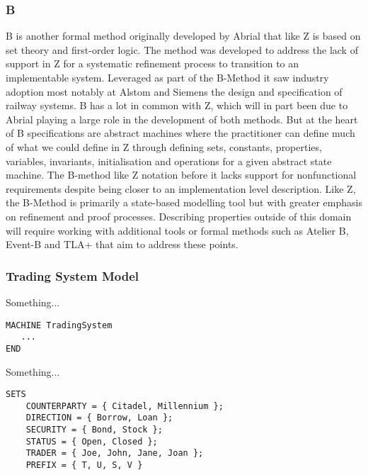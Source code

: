 \documentclass{article}
\begin{document}
\subsubsection*{B}

B is another formal method originally developed by Abrial that like Z is based on set theory and first-order logic. The method was developed to address the lack of support in Z for a systematic refinement process to transition to an implementable system. Leveraged as part of the B-Method it saw industry adoption most notably at Alstom and Siemens the design and specification of railway systems.  
\newline \newline
B has a lot in common with Z, which will in part been due to Abrial playing a large role in the development of both methods. But at the heart of B specifications are abstract machines where the practitioner can define much of what we could define in Z through defining sets, constants, properties, variables, invariants, initialisation and operations for a given abstract state machine.
\newline \newline
The B-method like Z notation before it lacks support for nonfunctional requirements despite being closer to an implementation level description. Like Z, the B-Method is primarily a state-based modelling tool but with greater emphasis on refinement and proof processes. Describing properties outside of this domain will require working with additional tools or formal methods such as Atelier B, Event-B and TLA+ that aim to address these points.

\newpage

\subsubsection*{Trading System Model}

Something...

\begin{lstlisting}
MACHINE TradingSystem
   ...
END
\end{lstlisting}

\hspace{-0.7cm} Something...

\begin{lstlisting}
SETS 
    COUNTERPARTY = { Citadel, Millennium };
    DIRECTION = { Borrow, Loan };
    SECURITY = { Bond, Stock };
    STATUS = { Open, Closed };
    TRADER = { Joe, John, Jane, Joan };
    PREFIX = { T, U, S, V }
\end{lstlisting}
\end{document}
